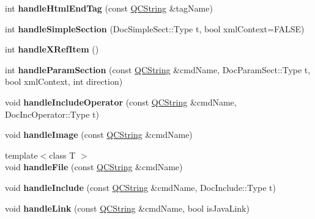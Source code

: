 \begin{DoxyCompactItemize}
\item 
\mbox{\label{class_doc_para_aa71f61738c3992d1e6be47e944995f06}} 
int {\bfseries handle\+Html\+End\+Tag} (const \mbox{\hyperlink{class_q_c_string}{Q\+C\+String}} \&tag\+Name)
\item 
\mbox{\label{class_doc_para_a027e048f1d5674b5200427ff2ee27e7f}} 
int {\bfseries handle\+Simple\+Section} (Doc\+Simple\+Sect\+::\+Type t, bool xml\+Context=F\+A\+L\+SE)
\item 
\mbox{\label{class_doc_para_a722190df7921222d83cce8c64ac67cee}} 
int {\bfseries handle\+X\+Ref\+Item} ()
\item 
\mbox{\label{class_doc_para_a313d4a548cc38e2d374a38b276fa86a0}} 
int {\bfseries handle\+Param\+Section} (const \mbox{\hyperlink{class_q_c_string}{Q\+C\+String}} \&cmd\+Name, Doc\+Param\+Sect\+::\+Type t, bool xml\+Context, int direction)
\item 
\mbox{\label{class_doc_para_a7c235343a063e005bfee6c68b14a835e}} 
void {\bfseries handle\+Include\+Operator} (const \mbox{\hyperlink{class_q_c_string}{Q\+C\+String}} \&cmd\+Name, Doc\+Inc\+Operator\+::\+Type t)
\item 
\mbox{\label{class_doc_para_a8984fc90ebc2e60c3d472d39d4eb6f94}} 
void {\bfseries handle\+Image} (const \mbox{\hyperlink{class_q_c_string}{Q\+C\+String}} \&cmd\+Name)
\item 
\mbox{\label{class_doc_para_a2c5971c7bbbb5bd01e02ac7d93600281}} 
{\footnotesize template$<$class T $>$ }\\void {\bfseries handle\+File} (const \mbox{\hyperlink{class_q_c_string}{Q\+C\+String}} \&cmd\+Name)
\item 
\mbox{\label{class_doc_para_a1bb9289a32b8c06de83c728786bb0669}} 
void {\bfseries handle\+Include} (const \mbox{\hyperlink{class_q_c_string}{Q\+C\+String}} \&cmd\+Name, Doc\+Include\+::\+Type t)
\item 
\mbox{\label{class_doc_para_a0bff680b96bc9c76b2228affeaa90bbb}} 
void {\bfseries handle\+Link} (const \mbox{\hyperlink{class_q_c_string}{Q\+C\+String}} \&cmd\+Name, bool is\+Java\+Link)

\end{DoxyCompactItemize}
